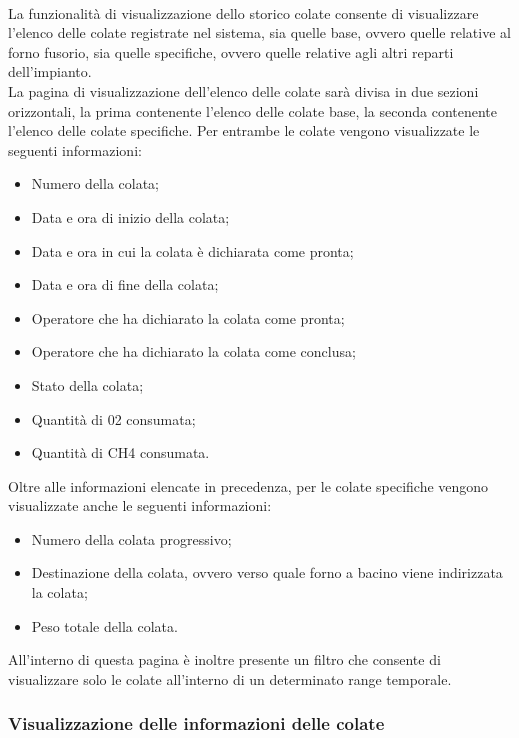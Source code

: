   \paragraph{}
  La funzionalità di visualizzazione dello storico colate consente di visualizzare l’elenco 
  delle colate registrate nel sistema, sia quelle base, ovvero quelle relative al forno fusorio, 
  sia quelle specifiche, ovvero quelle relative agli altri reparti dell’impianto.\\
  La pagina di visualizzazione dell’elenco delle colate sarà divisa in due sezioni orizzontali, 
  la prima contenente l’elenco delle colate base, la seconda contenente l’elenco delle colate specifiche. 
  Per entrambe le colate vengono visualizzate le seguenti informazioni: 
  \begin{itemize}
    \item Numero della colata;
    \item Data e ora di inizio della colata;
    \item Data e ora in cui la colata è dichiarata come pronta;
    \item Data e ora di fine della colata;
    \item Operatore che ha dichiarato la colata come pronta;
    \item Operatore che ha dichiarato la colata come conclusa;
    \item Stato della colata;
    \item Quantità di 02 consumata;
    \item Quantità di CH4 consumata.
  \end{itemize}
  Oltre alle informazioni elencate in precedenza, per le colate specifiche vengono visualizzate 
  anche le seguenti informazioni:
  \begin{itemize}
    \item Numero della colata progressivo;
    \item Destinazione della colata, ovvero verso quale forno a bacino viene indirizzata la colata;
    \item Peso totale della colata.
  \end{itemize}
  All’interno di questa pagina è inoltre presente un filtro che consente di visualizzare solo le colate 
  all'interno di un determinato range temporale.

  \subsubsection{Visualizzazione delle informazioni delle colate}
